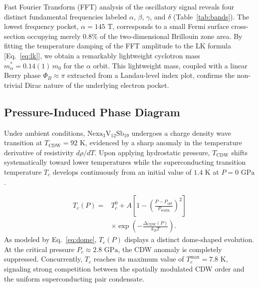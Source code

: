 \documentclass[aps,prb,reprint,superscriptaddress,amsmath,amssymb,citeautoscript]{revtex4-2}
\begin{document}
Fast Fourier Transform (FFT) analysis of the oscillatory signal reveals four distinct fundamental frequencies labeled $\alpha$, $\beta$, $\gamma$, and $\delta$ (Table~\ref{tab:bands}). The lowest frequency pocket, $\alpha = 145\text{~T}$, corresponds to a small Fermi surface cross-section occupying merely $0.8\%$ of the two-dimensional Brillouin zone area. By fitting the temperature damping of the FFT amplitude to the LK formula [Eq.~\eqref{eq:lk}], we obtain a remarkably lightweight cyclotron mass $m^*_\alpha = 0.14(1)\,m_0$ for the $\alpha$ orbit. This lightweight mass, coupled with a linear Berry phase $\Phi_B \approx \pi$ extracted from a Landau-level index plot, confirms the non-trivial Dirac nature of the underlying electron pocket.

\subsection{Pressure-Induced Phase Diagram}
Under ambient conditions, $\mathrm{Nexa}_{3}\mathrm{V}_{12}\mathrm{Sb}_{19}$ undergoes a charge density wave transition at $T_{\text{CDW}} = 92\text{~K}$, evidenced by a sharp anomaly in the temperature derivative of resistivity $d\rho/dT$. Upon applying hydrostatic pressure, $T_{\text{CDW}}$ shifts systematically toward lower temperatures while the superconducting transition temperature $T_c$ develops continuously from an initial value of $1.4\text{~K}$ at $P = 0\text{~GPa}$.

\begin{align}
T_c(P) ={} & T_c^0 + A \left[ 1 - \left(\frac{P - P_{\text{opt}}}{P_{\text{width}}}\right)^2 \right] \nonumber \\
& \times \exp\left( -\frac{\Delta_{\text{CDW}}(P)}{k_B T} \right).
\label{eq:dome}
\end{align}
As modeled by Eq.~\eqref{eq:dome}, $T_c(P)$ displays a distinct dome-shaped evolution. At the critical pressure $P_c \approx 2.8\text{~GPa}$, the CDW anomaly is completely suppressed. Concurrently, $T_c$ reaches its maximum value of $T_c^{\text{max}} = 7.8\text{~K}$, signaling strong competition between the spatially modulated CDW order and the uniform superconducting pair condensate.
\end{document}
